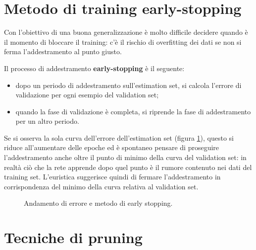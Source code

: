 \section{Metodo di training early-stopping}
\label{sec:metodo_di_training_early_stopping}

Con l'obiettivo di una buona generalizzazione è molto difficile decidere quando è il momento di bloccare il training: c'è il rischio di overfitting dei dati se non si ferma l'addestramento al punto giusto.

Il processo di addestramento \textbf{early-stopping} è il seguente:
\begin{itemize}
	\item dopo un periodo di addestramento sull'estimation set, si calcola l'errore di validazione per ogni esempio del validation set;
	\item quando la fase di validazione è completa, si riprende la fase di addestramento per un altro periodo.
\end{itemize}
Se si osserva la sola curva dell'errore dell'estimation set (figura \ref{fig:overfit}), questo si riduce all'aumentare delle epoche ed è spontaneo pensare di proseguire l'addestramento anche oltre il punto di minimo della curva del validation set: in realtà ciò che la rete apprende dopo quel punto è il rumore contenuto nei dati del training set. L'euristica suggerisce quindi di fermare l'addestramento in corrispondenza del minimo della curva relativa al validation set.
\begin{figure}[h!]
	\centering
	\caption{Andamento di errore e metodo di early stopping.}\label{fig:overfit}
\end{figure}

\section{Tecniche di pruning}
\label{sec:tecniche_di_pruning}

